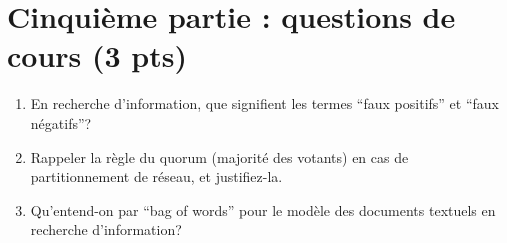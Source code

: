 \documentclass[11pt,a4paper]{article}
\begin{document}
\section*{Cinquième partie : questions de cours (3 pts)}


\begin{enumerate}
  \item En recherche d’information, que signifient les termes ``faux positifs'' et ``faux négatifs''?
  \item Rappeler la règle du quorum (majorité des votants) en cas de partitionnement de réseau, et justifiez-la.
   \item Qu’entend-on par ``bag of words'' pour le modèle des documents textuels en recherche d’information?
\end{enumerate}
\end{document}
